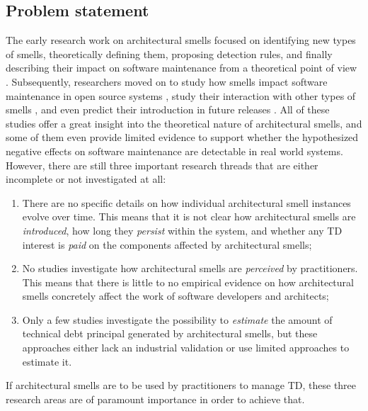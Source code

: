 \subsection{Problem statement}\label{sec:intro:problem-statement}
The early research work on architectural smells focused on identifying new types of smells, theoretically defining them, proposing detection rules, and finally describing their impact on software maintenance from a theoretical point of view \cite{Lippert2006,Garcia2009,Mo2015,Le2016,Arcelli2016}.
Subsequently, researchers moved on to study how smells impact software maintenance in open source systems \cite{Choudhary2016,Xiao2016,Le2018}, study their interaction with other types of smells \cite{Sharma2017,Arcelli2019}, and even predict their introduction in future releases \cite{Arcelli2019b}.
All of these studies offer a great insight into the theoretical nature of architectural smells, and some of them even provide limited evidence to support whether the hypothesized negative effects on software maintenance are detectable in real world systems.
However, there are still three important research threads that are either incomplete or not investigated at all:
\begin{enumerate}
    \item There are no specific details on how individual architectural smell instances evolve over time. This means that it is not clear how architectural smells are \emph{introduced}, how long they \emph{persist} within the system, and whether any TD interest is \emph{paid} on the components affected by architectural smells; 
    
    \item No studies investigate how architectural smells are \emph{perceived} by practitioners. This means that there is little to no empirical evidence on how architectural smells concretely affect the work of software developers and architects;
    
    \item Only a few studies investigate the possibility to \emph{estimate} the amount of technical debt principal generated by architectural smells, but these approaches either lack an industrial validation or use limited approaches to estimate it. 
\end{enumerate}
If architectural smells are to be used by practitioners to manage TD, these three research areas are of paramount importance in order to achieve that.

